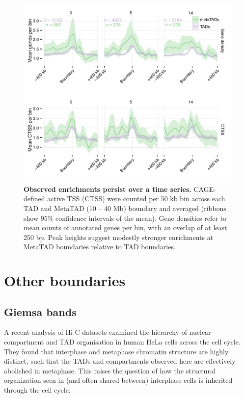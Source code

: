\documentclass[a4paper,10pt,oneside]{book}
\begin{document}
\begin{figure}
\begin{center} 
\includegraphics[width=.9\textwidth]{figs/mt_ts.pdf}
\captionsetup{width=\textwidth}
\caption{ {\bf Observed enrichments persist over a time series.}
CAGE-defined active TSS (CTSS) were counted per 50 kb bin across each TAD and MetaTAD (10 -- 40 Mb) boundary and averaged (ribbons show $95\%$ confidence intervals of the mean). Gene densities refer to mean counts of annotated genes per bin, with an overlap of at least 250 bp. Peak heights suggest modestly stronger enrichments at MetaTAD boundaries relative to TAD boundaries. 
}\label{fig:mtts}
\end{center}
\end{figure} 

\section{Other boundaries}

\subsection{Giemsa bands}

A recent analysis of Hi-C datasets examined the hierarchy of nuclear compartment and TAD organisation in human HeLa cells across the cell cycle. They found that interphase and metaphase chromatin structure are highly distinct, such that the TADs and compartments observed here are effectively abolished in metaphase.\cite{Naumova2013} This raises the question of how the structural organization seen in (and often shared between) interphase cells is inherited through the cell cycle.
\end{document}
